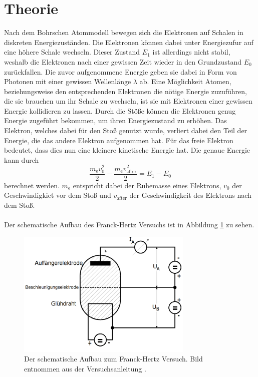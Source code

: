 \section{Theorie}
\label{sec:Theorie}
Nach dem Bohrschen Atommodell bewegen sich die Elektronen auf Schalen in diskreten Energiezuständen.
Die Elektronen können dabei unter Energiezufur auf eine höhere Schale wechseln.
Dieser Zustand $E_1$ ist allerdings nicht stabil, weshalb die Elektronen nach einer gewissen Zeit wieder in den Grundzustand $E_0$ zurückfallen.
Die zuvor aufgenommene Energie geben sie dabei in Form von Photonen mit einer gewissen Wellenlänge $\lambda$ ab.
Eine Möglichkeit Atomen, beziehungsweise den entsprechenden Elektronen die nötige Energie zuzuführen, die sie brauchen um ihr Schale zu wechseln, ist sie mit Elektronen einer gewissen Energie kollidieren zu lassen.
Durch die Stöße können die Elektronen genug Energie zugeführt bekommen, um ihren Energiezustand zu erhöhen.
Das Elektron, welches dabei für den Stoß genutzt wurde, verliert dabei den Teil der Energie, die das andere Elektron aufgenommen hat.
Für das freie Elektron bedeutet, dass dies nun eine kleinere kinetische Energie hat.
Die genaue Energie kann durch 
\begin{equation}
    \frac{m_\text{e} v_0^2}{2} - \frac{m_\text{e}v_\text{after}^2}{2} = E_1 - E_0
\end{equation} 
berechnet werden. $m_\text{e}$ entspricht dabei der Ruhemasse eines Elektrons, $v_0$ der Geschwindigkiet vor dem Stoß und $v_\text{after}$ der Geschwindigkeit des Elektrons nach dem Stoß.
\\\\
Der schematische Aufbau des Franck-Hertz Versuchs ist in Abbildung \ref{fig:schematischeraufbau} zu sehen.
\begin{figure}
    \centering
    \includegraphics[width=0.75\textwidth]{content/data/schematischeraufbau.png}
    \caption{Der schematische Aufbau zum Franck-Hertz Versuch. Bild entnommen aus der Versuchsanleitung \cite[2]{anleitung}.}
    \label{fig:schematischeraufbau}
\end{figure}

